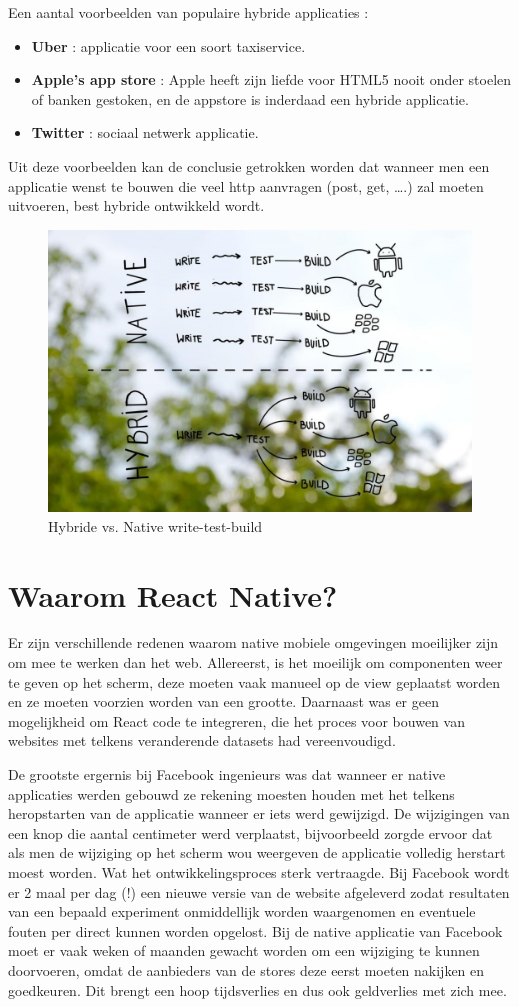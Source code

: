 Een aantal voorbeelden van populaire hybride applicaties : 

\begin{itemize}
	\item \textbf{Uber} : applicatie voor een soort taxiservice.
	\item \textbf{Apple's app store} : Apple heeft zijn liefde voor HTML5 nooit onder stoelen of banken gestoken, en de appstore is inderdaad een hybride applicatie.
	\item \textbf{Twitter} : sociaal netwerk applicatie.
\end{itemize}

Uit deze voorbeelden kan de conclusie getrokken worden dat wanneer men een applicatie wenst te bouwen die veel http aanvragen (post, get, ….) zal moeten uitvoeren, best hybride ontwikkeld wordt.
	
	\begin{figure}
		\centering
		\includegraphics[width=.5\columnwidth]{img/hybridevsnative.jpg}
		\caption{Hybride vs. Native write-test-build}
		\label{fig:hybridevsnative}
	\end{figure}
	
	\section{Waarom React Native?}
	Er zijn verschillende redenen waarom native mobiele omgevingen moeilijker zijn om mee te werken dan het web. Allereerst, is het moeilijk om componenten weer te geven op het scherm, deze moeten vaak manueel op de view geplaatst worden en ze moeten voorzien worden van een grootte. Daarnaast was er geen mogelijkheid om React code te integreren, die het proces voor bouwen van websites met telkens veranderende datasets had vereenvoudigd. 
	
De grootste ergernis bij Facebook ingenieurs was dat wanneer er native applicaties werden gebouwd ze rekening moesten houden met het telkens heropstarten van de applicatie wanneer er iets werd gewijzigd. De wijzigingen van een knop die aantal centimeter werd verplaatst, bijvoorbeeld zorgde ervoor dat als men de wijziging op het scherm wou weergeven de applicatie volledig herstart moest worden. Wat het ontwikkelingsproces sterk vertraagde. 
Bij Facebook wordt er 2 maal per dag (!) een nieuwe versie van de website afgeleverd zodat resultaten van een bepaald experiment onmiddellijk worden waargenomen en eventuele fouten per direct kunnen worden opgelost. Bij de native applicatie van Facebook moet er vaak weken of maanden gewacht worden om een wijziging te kunnen doorvoeren, omdat de aanbieders van de stores deze eerst moeten nakijken en goedkeuren. Dit brengt een hoop tijdsverlies  en dus ook geldverlies met zich mee. 

